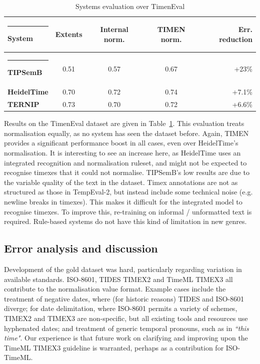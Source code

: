 \documentclass[10pt, a4paper]{article}
\begin{document}
\begin{table} [htb]
\begin{footnotesize}
\begin{center}
\begin{tabular} {lcccr}
  \hline\rule{-2pt}{8pt}
  {\bf System} & {\bf Extents} & {\bf Internal norm.} & {\bf TIMEN norm.} & {\bf Err. reduction}\\
  \hline\rule{-2pt}{8pt}
  {\bf TIPSemB} 		& 0.51	& 0.57	& 0.67	& +23\%  \\
  {\bf HeidelTime} 		& 0.70	& 0.72	& 0.74	& +7.1\% \\
  {\bf TERNIP} 			& 0.73	& 0.70	& 0.72	& +6.6\% \\
  \hline
\end{tabular}
\caption{Systems evaluation over TimenEval} \label{tab:timeneval}
\end{center}
\end{footnotesize}
\end{table}

Results on the TimenEval dataset are given in Table~\ref{tab:timeneval}. This evaluation treats normalisation equally, as no system has seen the dataset before. Again, TIMEN provides a significant performance boost in all cases, even over HeidelTime's normalisation. It is interesting to see an increase here, as HeidelTime uses an integrated recognition and normalisation ruleset, and might not be expected to recognise timexes that it could not normalise. TIPSemB's low results are due to the variable quality of the text in the dataset. Timex annotations are not as structured as those in TempEval-2, but instead include some technical noise (e.g. newline breaks in timexes). This makes it difficult for the integrated model to recognise timexes. To improve this, re-training on informal / unformatted text is required. Rule-based systems do not have this kind of limitation in new genres.

\subsection{Error analysis and discussion}

Development of the gold dataset was hard, particularly regarding variation in available standards. ISO-8601, TIDES TIMEX2 and TimeML TIMEX3 all contribute to the normalisation value format. Example cases include the treatment of negative dates, where (for historic reasons) TIDES and ISO-8601 diverge; for date delimitation, where ISO-8601 permits a variety of schemes, TIMEX2 and TIMEX3 are non-specific, but all existing tools and resources use hyphenated dates; and treatment of generic temporal pronouns, such as in \emph{``this time"}. Our experience is that future work on clarifying and improving upon the TimeML TIMEX3 guideline is warranted, perhaps as a contribution for ISO-TimeML.
\end{document}
